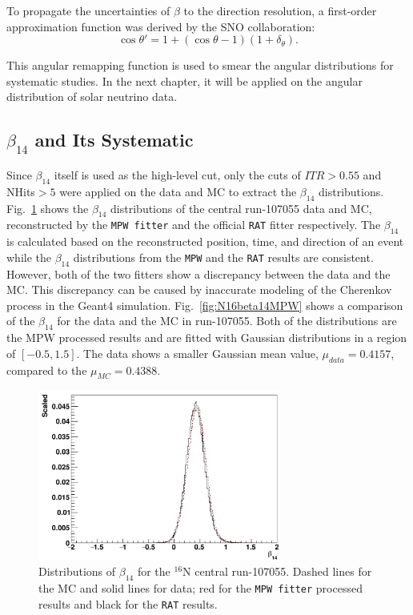 To propagate the uncertainties of $\beta$ to the direction resolution, a first-order approximation function was derived by the SNO collaboration\cite{drouin2012three}:
\begin{equation}\label{remapTheta}
\cos\theta'=1+(\cos\theta-1)(1+\delta_{\theta}).
\end{equation} 

This angular remapping function is used to smear the angular distributions for systematic studies. In the next chapter, it will be applied on the angular distribution of solar neutrino data. 

\subsection{$\beta_{14}$ and Its Systematic}
Since $\beta_{14}$ itself is used as the high-level cut, only the cuts of $ITR>0.55$ and NHits$>5$ were applied on the data and MC to extract the $\beta_{14}$ distributions.
Fig.~\ref{fig:N16beta14} shows the $\beta_{14}$ distributions of the central run-107055 data and MC, reconstructed by the \texttt{MPW fitter} and the official \texttt{RAT} fitter respectively. The $\beta_{14}$ is calculated based on the reconstructed position, time, and direction of an event while the $\beta_{14}$ distributions from the \texttt{MPW} and the \texttt{RAT} results are consistent. However, both of the two fitters show a discrepancy between the data and the MC. This discrepancy can be caused by inaccurate modeling of the Cherenkov process in the Geant4 simulation\cite{dunmore2004separation,beta14discrepancy}.
Fig.~\ref{fig:N16beta14MPW} shows a comparison of the $\beta_{14}$ for the data and the MC in run-107055. Both of the distributions are the MPW processed results and are fitted with Gaussian distributions in a region of $[-0.5,1.5]$. The data shows a smaller Gaussian mean value, $\mu_{data}=0.4157$, compared to the $\mu_{MC}=0.4388$.

\begin{figure}[htbp]
	\centering
	\includegraphics[width=8cm]{N16_beta14_107055.png}
	\caption{Distributions of $\beta_{14}$ for the $^{16}$N central run-107055. Dashed lines for the MC and solid lines for data; red for the \texttt{MPW fitter} processed results and black for the \texttt{RAT} results.}
	\label{fig:N16beta14}
\end{figure}

